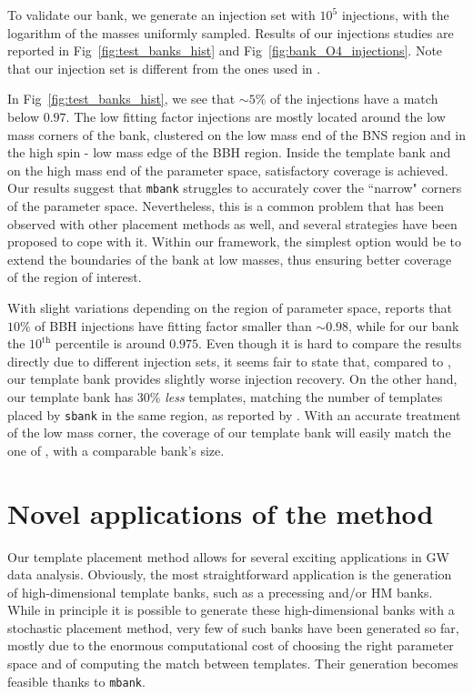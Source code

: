 \documentclass[twocolumn,showpacs,preprintnumbers,nofootinbib,prd,
superscriptaddress,10pt]{revtex4-2}
\begin{document}
To validate our bank, we generate an injection set with $10^5$ injections, with the logarithm of the masses uniformly sampled.
Results of our injections studies are reported in Fig~\ref{fig:test_banks_hist} and Fig~\ref{fig:bank_O4_injections}.
Note that our injection set is different from the ones used in \cite{Sakon:2022ibh}.

In Fig~\ref{fig:test_banks_hist}, we see that $\sim 5\%$ of the injections have a match below $0.97$. The low fitting factor injections are mostly located around the low mass corners of the bank, clustered on the low mass end of the BNS region and in the high spin - low mass edge of the BBH region.
Inside the template bank and on the high mass end of the parameter space, satisfactory coverage is achieved.
Our results suggest that \texttt{mbank} struggles to accurately cover the ``narrow" corners of the parameter space. Nevertheless, this is a common problem that has been observed with other placement methods as well, and several strategies have been proposed to cope with it. Within our framework, the simplest option would be to extend the boundaries of the bank at low masses, thus ensuring better coverage of the region of interest.

With slight variations depending on the region of parameter space, \cite{Sakon:2022ibh} reports that $10\%$ of BBH injections have fitting factor smaller than $\sim 0.98$, while for our bank the $10^\text{th}$ percentile is around $0.975$.
Even though it is hard to compare the results directly due to different injection sets, it seems fair to state that, compared to \cite{Sakon:2022ibh}, our template bank provides slightly worse injection recovery.
On the other hand, our template bank has $30\%$ {\it less} templates, matching the number of templates placed by \texttt{sbank} in the same region, as reported by \cite{Sakon:2022ibh}. With an accurate treatment of the low mass corner, the coverage of our template bank will easily match the one of \cite{Sakon:2022ibh}, with a comparable bank's size.

\section{Novel applications of the method} \label{sec:novel_applications}

Our template placement method allows for several exciting applications in GW data analysis.
Obviously, the most straightforward application is the generation of high-dimensional template banks, such as a precessing and/or HM banks. While in principle it is possible to generate these high-dimensional banks with a stochastic placement method, very few of such banks have been generated so far, mostly due to the enormous computational cost of choosing the right parameter space and of computing the match between templates. Their generation becomes feasible thanks to \texttt{mbank}.
\end{document}
